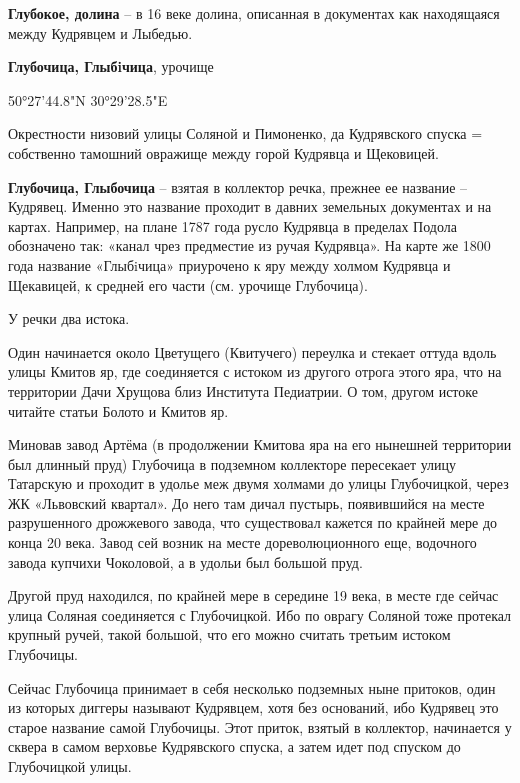 \medskip

\textbf{Глубокое, долина} – в 16 веке долина, описанная в документах как находящаяся между Кудрявцем и Лыбедью.\\

\medskip

\textbf{Глубочица, Глыбiчица}, урочище

50°27'44.8"N 30°29'28.5"E

Окрестности низовий улицы Соляной и Пимоненко, да Кудрявского спуска = собственно тамошний овражище между горой Кудрявца и Щековицей.\\

\medskip


\textbf{Глубочица, Глыбочица} – взятая в коллектор речка, прежнее ее название – Кудрявец. Именно это название проходит в давних земельных документах и на картах. Например, на плане 1787 года русло Кудрявца в пределах Подола обозначено так: «канал чрез предместие из ручая Кудрявца». На карте же 1800 года название «Глыбiчица» приурочено к яру между холмом Кудрявца и Щекавицей, к средней его части (см. урочище Глубочица).

У речки два истока. 

Один начинается около Цветущего (Квитучего) переулка и стекает оттуда вдоль улицы Кмитов яр, где соединяется с истоком из другого отрога этого яра, что на территории Дачи Хрущова близ Института Педиатрии. О том, другом истоке читайте статьи Болото и Кмитов яр.

Миновав завод Артёма (в продолжении Кмитова яра на его нынешней территории был длинный пруд) Глубочица в подземном коллекторе пересекает улицу Татарскую и проходит в удолье меж двумя холмами до улицы Глубочицкой, через ЖК «Львовский квартал». До него там дичал пустырь, появившийся на месте разрушенного дрожжевого завода, что существовал кажется по крайней мере до конца 20 века. Завод сей возник на месте дореволюционного еще, водочного завода купчихи Чоколовой, а в удольи был большой пруд.

Другой пруд находился, по крайней мере в середине 19 века, в месте где сейчас улица Соляная соединяется с Глубочицкой. Ибо по оврагу Соляной тоже протекал крупный ручей, такой большой, что его можно считать третьим истоком Глубочицы.

Сейчас Глубочица принимает в себя несколько подземных ныне притоков, один из которых диггеры называют Кудрявцем, хотя без оснований, ибо Кудрявец это старое название самой Глубочицы. Этот приток, взятый в коллектор, начинается у сквера в самом верховье Кудрявского спуска, а затем идет под спуском до Глубочицкой улицы.

